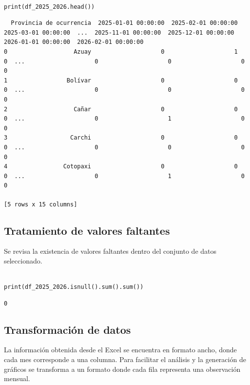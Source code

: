 \documentclass[11pt]{article}
\begin{document}
\begin{verbatim}

print(df_2025_2026.head())

\end{verbatim}
\begin{verbatim}
  Provincia de ocurrencia  2025-01-01 00:00:00  2025-02-01 00:00:00  2025-03-01 00:00:00  ...  2025-11-01 00:00:00  2025-12-01 00:00:00  2026-01-01 00:00:00  2026-02-01 00:00:00
0                   Azuay                    0                    1                    0  ...                    0                    0                    0                    0
1                 Bolívar                    0                    0                    0  ...                    0                    0                    0                    0
2                   Cañar                    0                    0                    0  ...                    0                    1                    0                    0
3                  Carchi                    0                    0                    0  ...                    0                    0                    0                    0
4                Cotopaxi                    0                    0                    0  ...                    0                    1                    0                    0

[5 rows x 15 columns]
\end{verbatim}


\subsection{Tratamiento de valores faltantes}
\label{sec:org3a19b41}

Se revisa la existencia de valores faltantes dentro del conjunto de datos
seleccionado.

\begin{verbatim}

print(df_2025_2026.isnull().sum().sum())

\end{verbatim}

\begin{verbatim}
0
\end{verbatim}

\subsection{Transformación de datos}
\label{sec:org65d7d35}

La información obtenida desde el Excel se encuentra en formato ancho,
donde cada mes corresponde a una columna. Para facilitar el análisis y
la generación de gráficos se transforma a un formato donde cada fila
representa una observación mensual.
\end{document}
